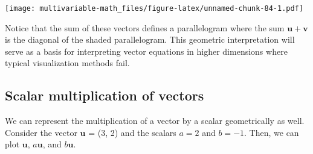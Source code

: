 \documentclass[
]{book}
\newenvironment{Shaded}{\begin{snugshade}}{\end{snugshade}}
\newcommand{\DataTypeTok}[1]{\textcolor[rgb]{0.13,0.29,0.53}{#1}}
\newcommand{\DecValTok}[1]{\textcolor[rgb]{0.00,0.00,0.81}{#1}}
\newcommand{\FloatTok}[1]{\textcolor[rgb]{0.00,0.00,0.81}{#1}}
\newcommand{\KeywordTok}[1]{\textcolor[rgb]{0.13,0.29,0.53}{\textbf{#1}}}
\newcommand{\NormalTok}[1]{#1}
\newcommand{\OperatorTok}[1]{\textcolor[rgb]{0.81,0.36,0.00}{\textbf{#1}}}
\newcommand{\StringTok}[1]{\textcolor[rgb]{0.31,0.60,0.02}{#1}}
\theoremstyle{definition}
\theoremstyle{definition}
\theoremstyle{definition}
\theoremstyle{remark}
\begin{document}
\texttt{[image: multivariable-math\_files/figure-latex/unnamed-chunk-84-1.pdf]}

Notice that the sum of these vectors defines a parallelogram where the sum \(\mathbf{u} + \mathbf{v}\) is the diagonal of the shaded parallelogram. This geometric interpretation will serve as a basis for interpreting vector equations in higher dimensions where typical visualization methods fail.

\hypertarget{scalar-multiplication-of-vectors}{%
\subsection{Scalar multiplication of vectors}\label{scalar-multiplication-of-vectors}}

We can represent the multiplication of a vector by a scalar geometrically as well. Consider the vector \(\mathbf{u}\) = (3, 2) and the scalars \(a = 2\) and \(b = -1\). Then, we can plot \(\mathbf{u}\), \(a\mathbf{u}\), and \(b\mathbf{u}\).

\begin{Shaded}
\end{Shaded}
\end{document}
